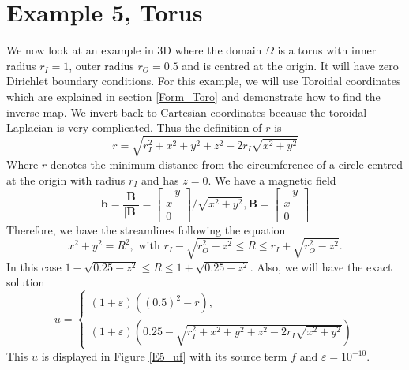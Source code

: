 \documentclass[12pt]{ociamthesis}
\begin{document}
\section{Example 5, Torus}
We now look at an example in 3D where the domain $\Omega $ is a torus with inner radius $r_I = 1$, outer radius $r_O = 0.5$ and is centred at the origin. It will have zero Dirichlet boundary conditions. For this example, we will use Toroidal coordinates which are explained in section \ref{Form_Toro} and demonstrate how to find the inverse map. We invert back to Cartesian coordinates because the toroidal Laplacian is very complicated. Thus the definition of $r$ is
\begin{equation}
r = \sqrt{r_I^2 + x^2 + y^2 + z^2 -2r_I\sqrt{x^2+y^2}}
\end{equation}
Where $r$ denotes the minimum distance from the circumference of a circle centred at the origin with radius $r_I$ and has $z=0$. We have a magnetic field 
\begin{equation}
\mathbf{b} = \frac{\mathbf{B}}{|\mathbf{B}|} = 
\left[ \begin{matrix}
-y\\
 x \\
 0
\end{matrix} \right]/\sqrt{x^2+y^2}, 
\mathbf{B} = \left[ \begin{matrix}
-y\\
 x\\
 0
\end{matrix} \right]
\end{equation}
Therefore, we have the streamlines following the equation
\begin{equation}
x^2 + y^2 = R^2, \text{ with } r_I-\sqrt{r_O^2-z^2} \leq R \leq r_I+\sqrt{r_O^2-z^2}.
\end{equation}
In this case $1-\sqrt{0.25-z^2} \leq R \leq 1 + \sqrt{0.25+z^2}$. Also, we will have the exact solution
\begin{equation}
u = 
\begin{cases}
(1+\varepsilon)((0.5)^2 - r ),\\
(1+\varepsilon)(0.25 -  \sqrt{r_I^2 + x^2 + y^2 + z^2 -2r_I\sqrt{x^2+y^2}})
\end{cases}
\end{equation}
This $u$ is displayed in Figure \ref{E5_uf} with its source term $f$ and $\varepsilon=10^{-10}$.
\end{document}
